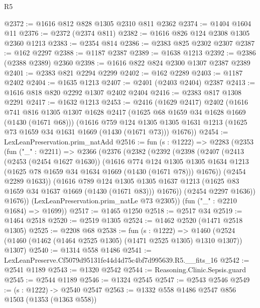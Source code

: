 \begin{lexlean}{R5}
\begin{coremodule}
@2372 := @1616 @812 @828 @1305 @2310 @811 @2362
@2374 := @1404 @1604 @11
@2376 := @2372 (@2374 @811)
@2382 := @1616 @826 @124 @2308 @1305 @2360 @1213
@2383 := @2354 @814
@2386 := @2383 @825 @2302 @2307
@2387 := @162 @2297
@2388 := @1187 @2387
@2389 := @1638 @1213
@2392 := @2386 (@2388 @2389) @2360
@2398 := @1616 @822 @824 @2300 @1307 @2387 @2389
@2401 := @2383 @821 @2294 @2299
@2402 := @162 @2289
@2403 := @1187 @2402
@2404 := @1635 @1213
@2407 := @2401 (@2403 @2404) @2387
@2413 := @1616 @818 @820 @2292 @1307 @2402 @2404
@2416 := @2383 @817 @1308 @2291
@2417 := @1632 @1213
@2453 := @2416
    (@1629 @2417)
    @2402
    (@1616
      @741
      @816
      @1305
      @1307
      @1628
      @2417
      (@1625 @68 @1659 @34 @1628 @1669 (@1430 (@1671 @68)))
      (@1616
        @759
        @124
        @1305
        @1305
        @1631
        @1213
        (@1625 @73 @1659 @34 @1631 @1669 (@1430 (@1671 @73)))
        @1676))
@2454 := LexLeanPreservation.prim_natAdd
@2516 := fun (s : @1222) =>
  @2283
    (@2353
      (fun ("_" : @2211) =>
      @2366
        (@2376
          (@2382
            (@2392
              (@2398
                (@2407
                  (@2413
                    (@2453 (@2454 @1627 @1630))
                    (@1616
                      @774
                      @124
                      @1305
                      @1305
                      @1634
                      @1213
                      (@1625 @78 @1659 @34 @1634 @1669 (@1430 (@1671 @78)))
                      @1676))
                  (@2454 @2289 @1633))
                (@1616
                  @789
                  @124
                  @1305
                  @1305
                  @1637
                  @1213
                  (@1625 @83 @1659 @34 @1637 @1669 (@1430 (@1671 @83)))
                  @1676))
              (@2454 @2297 @1636))
            @1676))
        (LexLeanPreservation.prim_natLe @73 @2305))
      (fun ("_" : @2210 @1684) => @1699))
@2517 := @1465 @1250
@2518 := @2517 @34
@2519 := @1464 @2518
@2520 := @2519 @1305
@2524 := @1462 @2520 (@1471 @2518 @1305)
@2525 := @2208 @68
@2538 := fun (s : @1222) =>
  @1460 (@2524 (@1460 (@1462 (@1464 @2525 @1305) (@1471 @2525 @1305) @1310 @1307)) @1307)
@2540 := @1314 @558 @1486
@2541 := LexLeanPreserve.Cf5079d95131fe44d4d75c4bf7d995639.R5.__fits_16
@2542 := @2541 @1189
@2543 := @1320 @2542
@2544 := Reasoning.Clinic.Sepsis.guard
@2545 := @2544 @1189
@2546 := @1324 @2545
@2547 := @2543 @2546
@2549 := (s : @1222) -> @2540 @2547
@2563 := @1332
    @558
    @1486
    @2547
    @856
    @1503
    (@1353 (@1363 @558))

\end{coremodule}
\end{lexlean}
